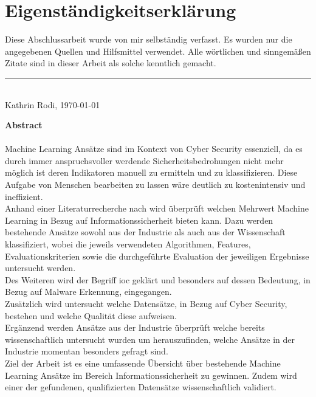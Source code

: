 \documentclass[
    12pt, %
    DIV10,
    ngerman, %
    a4paper, %
    oneside, %
    titlepage, %
    parskip=half, %
    headings=normal, %
    listof=totoc, %
    bibliography=totoc, %
    index=totoc, %
    captions=tableheading, %
    final %
]{scrreprt}
\begin{document}
\section*{Eigenständigkeitserklärung}
Diese Abschlussarbeit wurde von mir selbständig verfasst. Es wurden nur die angegebenen
Quellen und Hilfsmittel verwendet. Alle wörtlichen und sinngemä{\ss}en Zitate
sind in dieser Arbeit als solche kenntlich gemacht.
\begin{center}
\end{center}
\rule[0.5em]{25em}{0.5pt} \\
Kathrin Rodi, \today
 \begin{center}
 \end{center}
\newpage
\noindent \textbf{Abstract}\\\\
\noindent Machine Learning Ansätze sind im Kontext von Cyber Security essenziell, da es durch immer anspruchsvoller werdende Sicherheitsbedrohungen nicht mehr möglich ist deren Indikatoren manuell zu ermitteln und zu klassifizieren. Diese Aufgabe von Menschen bearbeiten zu lassen wäre deutlich zu kostenintensiv und ineffizient.\\
\noindent Anhand einer Literaturrecherche nach \textcite{Webster2002} wird überprüft welchen Mehrwert Machine Learning in Bezug auf Informationssicherheit bieten kann. Dazu werden bestehende Ansätze sowohl aus der Industrie als auch aus der Wissenschaft klassifiziert, wobei die jeweils verwendeten Algorithmen, Features, Evaluationskriterien sowie die durchgeführte Evaluation der jeweiligen Ergebnisse untersucht werden.\\
\noindent Des Weiteren wird der Begriff \acf{ioc} geklärt und besonders auf dessen Bedeutung, in Bezug auf Malware Erkennung, eingegangen.\\
\noindent Zusätzlich wird untersucht welche Datensätze, in Bezug auf Cyber Security, bestehen und welche Qualität diese aufweisen.\\
\noindent Ergänzend werden Ansätze aus der Industrie überprüft welche bereits wissenschaftlich untersucht wurden um herauszufinden, welche Ansätze in der Industrie momentan besonders gefragt sind.\\
\noindent Ziel der Arbeit ist es eine umfassende Übersicht über bestehende Machine Learning Ansätze im Bereich Informationssicherheit zu gewinnen. Zudem wird einer der gefundenen, qualifizierten Datensätze wissenschaftlich validiert. 
\end{document}
